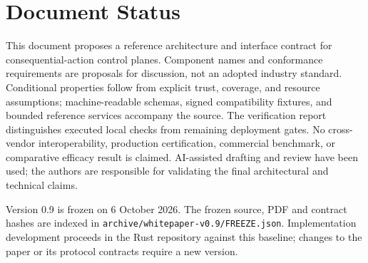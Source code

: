 \documentclass[letterpaper,11pt,headings=normal]{scrartcl}
\theoremstyle{definition}
\begin{document}
\section*{Document Status}
This document proposes a reference architecture and interface contract for consequential-action control planes. Component names and conformance requirements are proposals for discussion, not an adopted industry standard. Conditional properties follow from explicit trust, coverage, and resource assumptions; machine-readable schemas, signed compatibility fixtures, and bounded reference services accompany the source. The verification report distinguishes executed local checks from remaining deployment gates. No cross-vendor interoperability, production certification, commercial benchmark, or comparative efficacy result is claimed. AI-assisted drafting and review have been used; the authors are responsible for validating the final architectural and technical claims.

Version 0.9 is frozen on 6 October 2026. The frozen source, PDF and contract hashes are indexed in \texttt{archive/whitepaper-v0.9/FREEZE.json}. Implementation development proceeds in the Rust repository against this baseline; changes to the paper or its protocol contracts require a new version.


{\fontsize{9}{10}\selectfont}
\end{document}

